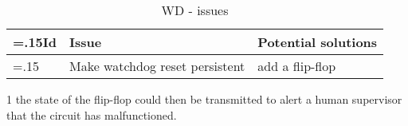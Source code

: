 
\begin{table}[H]
    \centering
    \begin{threeparttable}[b]
        \begin{tabularx}{\linewidth}{ >{\hsize=.15\hsize}X >{\hsize=1.35\hsize}X >{\hsize=1.5\hsize}X }
            \toprule
            Id & Issue                           & Potential solutions      \\
            \midrule
            1  & Make watchdog reset  persistent & add a flip-flop\tnote{1} \\
            \bottomrule
        \end{tabularx}
        \begin{tablenotes}
            \item [1] the state of the flip-flop could then be transmitted to alert a human supervisor that the circuit has malfunctioned.
        \end{tablenotes}
    \end{threeparttable}
    \caption{WD - issues}
\end{table}